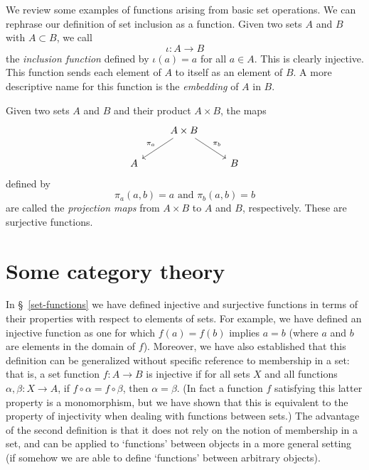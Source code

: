 \begin{sectionthm}
    We review some examples of functions arising from basic set operations. We can rephrase our definition of set inclusion as a function. Given two sets \(A\) and \(B\) with \(A \subset B\), we call
    \[
        \iota: A \to B
    \]
    the \emph{inclusion function} defined by \(\iota(a) = a\) for all \(a \in A\). This is clearly injective. This function sends each element of \(A\) to itself as an element of \(B\). A more descriptive name for this function is the \emph{embedding} of \(A\) in \(B\).

    Given two sets \(A\) and \(B\) and their product \(A \times B\), the maps
    \[
        \begin{tikzcd}
            & A\times B \arrow[ld, "\pi_a"'] \arrow[rd, "\pi_b"] &   \\
          A &                                                    & B
          \end{tikzcd}
    \]
    defined by
    \[
        \pi_a(a, b) = a \text{ and } \pi_b(a, b) = b
    \]
    are called the \emph{projection maps} from \(A \times B\) to \(A\) and \(B\), respectively. These are surjective functions.
\end{sectionthm}


\section{Some category theory}
\label{sec:category-theory}

In \S~\ref{set-functions} we have defined injective and surjective functions in
terms of their properties with respect to elements of sets. For example, we have
defined an injective function as one for which \(f(a) = f(b)\) implies \(a = b\)
(where \(a\) and \(b\) are elements in the domain of \(f\)). Moreover, we have
also established that this definition can be generalized without specific
reference to membership in a set: that is, a set function \(f: A \to B\) is
injective if for all sets \(X\) and all functions \(\alpha, \beta: X \to A\), if
\(f \circ \alpha = f \circ \beta\), then \(\alpha = \beta\). (In fact a function
\(f\) satisfying this latter property is a monomorphism, but we have shown that
this is equivalent to the property of injectivity when dealing with functions
between sets.) The advantage of the second definition is that it does not rely
on the notion of membership in a set, and can be applied to `functions' between
objects in a more general setting (if somehow we are able to define `functions'
between arbitrary objects).

